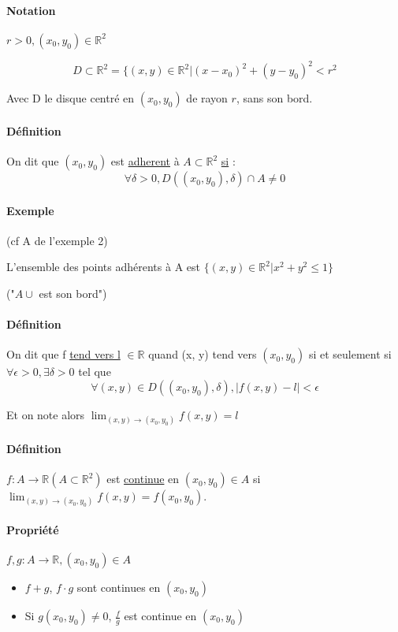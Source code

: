 \paragraph{Notation} $r > 0, (x_0, y_0) \in \mathbb{R}^2$

\[D \subset \mathbb{R}^2 = \{(x, y) \in \mathbb{R}^2 | (x-x_0)^2 + (y-y_0)^2 < r^2\]

Avec D le disque centré en $(x_0, y_0)$ de rayon $r$, sans son bord.

\paragraph{Définition} On dit que $(x_0, y_0)$ est \ul{adherent} à $A \subset \mathbb{R}^2$ \ul{si} : \[\forall \delta > 0, D((x_0, y_0), \delta) \cap A \neq 0\]

\paragraph{Exemple} (cf A de l'exemple 2)

L'ensemble des points adhérents à A est $\{(x, y) \in \mathbb{R}^2 | x^2 + y^2 \leq 1\}$

("$A \cup$ est son bord")

\paragraph{Définition} On dit que f \ul{tend vers l} $\in \mathbb{R}$ quand (x, y) tend vers $(x_0, y_0)$ si et seulement si $\forall \epsilon > 0, \exists \delta > 0$ tel que \[\forall (x, y) \in D((x_0, y_0), \delta), |f(x, y) - l| < \epsilon\]

Et on note alors $\lim_{(x, y) \to (x_0, y_0)} f(x, y) = l$

\paragraph{Définition} $f:A \rightarrow \mathbb{R} (A \subset \mathbb{R}^2)$ est \ul{continue} en $(x_0, y_0) \in A$ si $\lim_{(x, y) \to (x_0, y_0)} f(x, y) = f(x_0, y_0)$.

\paragraph{Propriété} $f, g : A \rightarrow \mathbb{R}, (x_0, y_0) \in A$

\begin{itemize}
	\item $f+g$, $f\cdot g$ sont continues en $(x_0, y_0)$
	\item Si $g(x_0, y_0) \neq 0$, $\frac{f}{g}$ est continue en $(x_0, y_0)$
\end{itemize}


